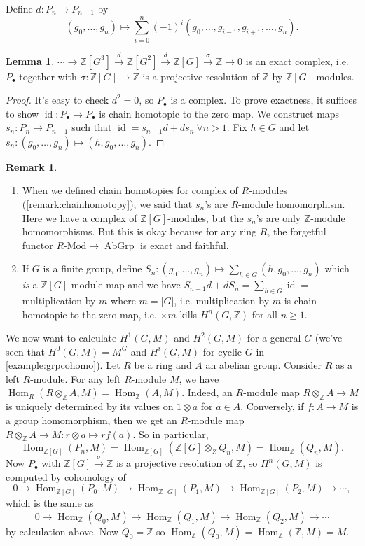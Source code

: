 \documentclass{article}
\newcommand{\Z}{\mathbb{Z}}
\newcommand{\id}{\operatorname{id}}
\newcommand{\Hom}{\operatorname{Hom}}
\newcommand{\AbGrp}{{\operatorname{AbGrp}}}
\theoremstyle{definition}
\newtheorem{lemma}[defn]{Lemma}
\newtheorem{remark}[defn]{Remark}
\begin{document}
Define $d:P_n\rightarrow P_{n-1}$ by \[(g_0,\ldots,g_n)\mapsto\sum_{i=0}^n (-1)^i (g_0,\ldots,g_{i-1},g_{i+1},\ldots,g_n).\]

\begin{lemma}
$\cdots\rightarrow\Z[G^3]\xrightarrow{d}\Z[G^2]\xrightarrow{d}\Z[G]\xrightarrow{\sigma}\Z\rightarrow 0$ is an exact complex, i.e. $P_\bullet$ together with $\sigma:\Z[G]\rightarrow\Z$ is a projective resolution of $\Z$ by $\Z[G]$-modules.
\end{lemma}
\begin{proof}
It's easy to check $d^2=0$, so $P_\bullet$ is a complex. To prove exactness, it suffices to show $\id:P_\bullet\rightarrow P_\bullet$ is chain homotopic to the zero map. We construct maps $s_n:P_n\rightarrow P_{n+1}$ such that $\id=s_{n-1}d+ds_n \ \forall n>1$. Fix $h\in G$ and let $s_n:(g_0,\ldots,g_n)\mapsto (h,g_0,\ldots,g_n)$.
\end{proof}

\begin{remark}
\begin{enumerate}
\item When we defined chain homotopies for complex of $R$-modules (\ref{remark:chainhomotopy}), we said that $s_n$'s are $R$-module homomorphism. Here we have a complex of $\Z[G]$-modules, but the $s_n$'s are only $\Z$-module homomorphisms. But this is okay because for any ring $R$, the forgetful functor $R\text{-Mod}\rightarrow\AbGrp$ is exact and faithful.
\item If $G$ is a finite group, define $S_n:(g_0,\ldots,g_n)\mapsto \sum_{h\in G}(h,g_0,\ldots,g_n)$ which \textit{is} a $\Z[G]$-module map and we have $S_{n-1}d+dS_n=\sum_{h\in G}\id=$ multiplication by $m$ where $m=|G|$, i.e. multiplication by $m$ is chain homotopic to the zero map, i.e. $\times m$ kills $H^n(G,\Z)$ for all $n\geq 1$. 
\end{enumerate}
\end{remark}

We now want to calculate $H^1(G,M)$ and $H^2(G,M)$ for a general $G$ (we've seen that $H^0(G,M)=M^G$ and $H^i(G,M)$ for cyclic $G$ in \ref{example:grpcohomo}). Let $R$ be a ring and $A$ an abelian group. Consider $R$ as a left $R$-module. For any left $R$-module $M$, we have $\Hom_R(R\otimes_\Z A,M)=\Hom_\Z(A,M)$. Indeed, an $R$-module map $R\otimes_\Z A\rightarrow M$ is uniquely determined by its values on $1\otimes a$ for $a\in A$. Conversely, if $f:A\rightarrow M$ is a group homomorphism, then we get an $R$-module map $R\otimes_\Z A\rightarrow M:r\otimes a\mapsto rf(a)$. So in particular,
\[
\Hom_{\Z[G]}(P_n,M)=\Hom_{\Z[G]}(\Z[G]\otimes_Z Q_n,M)=\Hom_\Z(Q_n,M).
\]
Now $P_\bullet$ with $\Z[G]\xrightarrow{\sigma}\Z$ is a projective resolution of $\Z$, so $H^n(G,M)$ is computed by cohomology of
\[
0\rightarrow\Hom_{\Z[G]}(P_0,M)\rightarrow\Hom_{\Z[G]}(P_1,M)\rightarrow\Hom_{\Z[G]}(P_2,M)\rightarrow\cdots,
\]
which is the same as
\[
0\rightarrow\Hom_\Z(Q_0,M)\rightarrow\Hom_\Z(Q_1,M)\rightarrow\Hom_\Z(Q_2,M)\rightarrow\cdots
\]
by calculation above. Now $Q_0=\Z$ so $\Hom_\Z(Q_0,M)=\Hom_\Z(\Z,M)=M$.
\end{document}

